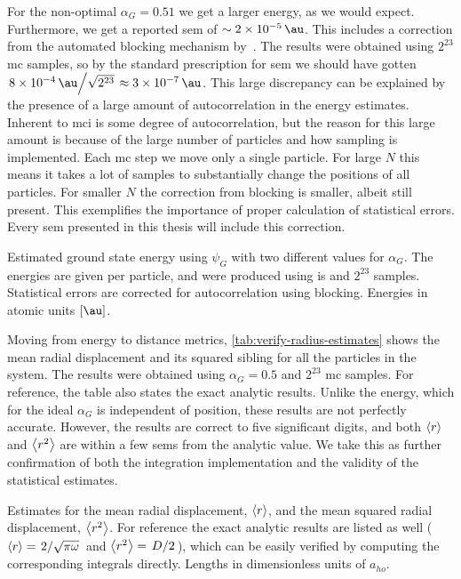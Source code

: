 \documentclass[Thesis.tex]{subfiles}
\begin{document}
For the non-optimal $\alpha_G=0.51$ we get a larger energy, as we would expect.
Furthermore, we get a reported \gls{sem} of $\sim \SI{2e-5}{\au}$. This
includes a correction from the automated blocking mechanism
by~\textcite{Jonsson-2018}. The results were obtained using $2^{23}$ \gls{mc}
samples, so by the standard prescription for \gls{sem} we should have
gotten $\flatfrac{\SI{8e-4}{\au}}{\sqrt{2^{23}}} \approx \SI{3e-7}{\au}$. This
large discrepancy can be explained by the presence of a large amount of
autocorrelation in the energy estimates. Inherent to \gls{mci} is
some degree of autocorrelation, but the reason for this large amount is because
of the large number of particles and how sampling is implemented. Each \gls{mc}
step we move only a single particle. For large $N$ this means it takes a
lot of samples to substantially change the positions of all particles. For smaller
$N$ the correction from blocking is smaller, albeit still present. This
exemplifies the importance of proper calculation of statistical errors. Every
\gls{sem} presented in this thesis will include this correction.


\begin{table}[h]
  \centering
  \caption[Ground state energies of the ideal harmonic oscillator]{\label{tab:verify-energy-estimates}Estimated ground state energy
    using $\psi_G$ with two different values for $\alpha_G$. The energies are
    given per particle, and were produced using \gls{is} and
    $2^{23}$ samples. Statistical errors are corrected for autocorrelation using
    blocking. Energies in atomic units $[\si{\au}]$.}
  
\end{table}

Moving from energy to distance metrics, \cref{tab:verify-radius-estimates} shows
the mean radial displacement and its squared sibling for all the particles in the system.
The results were obtained using $\alpha_G=0.5$ and $2^{23}$ \gls{mc} samples. For
reference, the table also states the exact analytic results. Unlike the energy,
which for the ideal $\alpha_G$ is independent of position, these results are not
perfectly accurate. However, the results are correct to five significant digits,
and both $\expval{r}$ and $\expval{r^2}$ are within a few \glspl{sem} from
the analytic value. We take this as further confirmation of both the integration
implementation and the validity of the statistical estimates.

\begin{table}[h]
  \centering
  \caption[Radial metrics of the ideal harmonic oscillator]{\label{tab:verify-radius-estimates}Estimates for the mean radial
    displacement, $\expval{r}$, and the mean squared radial displacement,
    $\expval{r^2}$. For reference the exact analytic results are listed as well
    ($\expval{r}=\flatfrac{2}{\sqrt{\pi\omega}}$ and
    $\expval{r^2}=\flatfrac{D}{2}$), which can be easily verified by computing
    the corresponding integrals directly. Lengths in dimensionless units of $a_{ho}$.}
  
\end{table}
\end{document}
